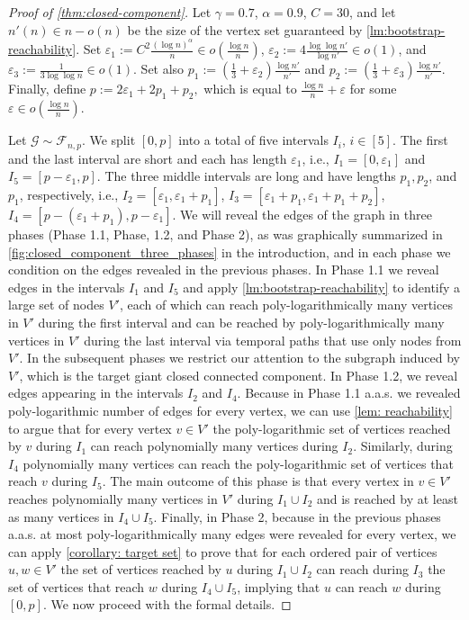 \documentclass[a4paper,11pt]{article}
\makeatletter
\theoremstyle{definition}
\theoremstyle{plain}
\let\eps\varepsilon
\newcommand{\G}{\mathcal G}
\newcommand{\F}{\mathcal F}
\newcommand{\aas}{a.a.s.\@\xspace}
\newcommand{\pfrac}[2]{{\left(\frac{#1}{#2}\right)}}
\makeatother
\begin{document}
\begin{proof}[Proof of \cref{thm:closed-component}]
	Let $\gamma=0.7$, $\alpha=0.9$, $C = 30$,
	and let $n'(n) \in n-o(n)$ be the size of the vertex set guaranteed by \cref{lm:bootstrap-reachability}.
	Set $\eps_1 := C^2 \frac{(\log n)^\alpha}{n} \in o\pfrac{\log n}{n}$,
	$\eps_2 := 4\frac{\log \log n'}{\log n'} \in o(1)$, and
	$\eps_3 := \frac{1}{3\log \log n} \in o(1)$.
	Set also $p_1 := \left(\frac{1}{3} + \eps_2\right) \frac{\log n'}{n'}$ and 
	$p_2 := \left(\frac{1}{3} + \eps_3\right) \frac{\log n'}{n'}$.
	Finally, define 
	$
	p := 2\eps_1 + 2p_1 + p_2,
	$
	which is equal to $\frac{\log n}{n} + \eps$ for some $\eps \in o\pfrac{\log n}{n}$.
	
	
	Let $\G \sim \F_{n,p}$. We split $[0,p]$
	into a total of five intervals $I_i$, $i \in [5]$. The first and the last interval are short and each has length $\eps_1$, i.e., $I_1 = [0, \eps_1]$ and $I_5 = [p-\eps_1, p]$. The three middle intervals are long
	and have lengths $p_1, p_2$, and $p_1$, respectively, i.e., $I_2=[\eps_1, \eps_1 + p_1]$,
	$I_3 = [\eps_1 + p_1, \eps_1 + p_1 + p_2]$, $I_4 = [p - (\eps_1 + p_1), p-\eps_1]$.
	We will reveal the edges of the graph in three phases (Phase 1.1, Phase, 1.2, and Phase 2), as was graphically summarized in \cref{fig:closed_component_three_phases} in the introduction, and in each phase we condition on the edges revealed in the previous phases. In Phase 1.1 we reveal edges in the intervals $I_1$ and
	$I_5$ and apply \cref{lm:bootstrap-reachability} to identify a large set of nodes $V'$, each of which can reach poly-logarithmically many vertices in $V'$ during the first interval and can be reached by poly-logarithmically many vertices in $V'$ during the last interval via temporal paths that use only nodes from $V'$. In the subsequent phases we restrict our attention to the subgraph induced by $V'$, which is the target giant closed connected component.
	In Phase 1.2, we reveal edges appearing in the intervals $I_2$ and $I_4$. Because in 
	Phase 1.1 \aas we revealed poly-logarithmic number of edges for every vertex, we can use \cref{lem: reachability} to argue that for every vertex $v \in V'$ the poly-logarithmic set of vertices reached by $v$ during $I_1$ can reach polynomially many vertices during $I_2$. Similarly, during $I_4$ polynomially many
	vertices can reach the poly-logarithmic set of vertices that reach $v$ during $I_5$. The main outcome of this phase is that every vertex in $v \in V'$ reaches polynomially many vertices in $V'$ during $I_1 \cup I_2$ and is reached by at least as many vertices in $I_4 \cup I_5$. 
	Finally, in Phase 2, because in the previous phases \aas at most poly-logarithmically many
	edges were revealed for every vertex, we can apply \cref{corollary: target set} to prove that for each ordered pair of vertices $u,w \in V'$ the set of vertices reached by $u$ during $I_1 \cup I_2$ can reach during $I_3$ the set of vertices that reach $w$ during $I_4 \cup I_5$, implying that $u$ can reach $w$ during $[0,p]$. We now proceed with the formal details.
		

\end{proof}
\end{document}

